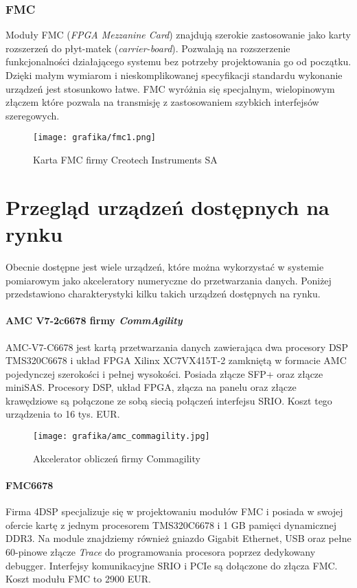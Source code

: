 \subsubsection{FMC}
Moduły FMC (\textit{FPGA Mezzanine Card}) znajdują szerokie zastosowanie jako karty rozszerzeń do płyt-matek (\textit{carrier-board}). Pozwalają na rozszerzenie funkcjonalności działającego systemu bez potrzeby projektowania go od początku. Dzięki małym wymiarom i nieskomplikowanej  specyfikacji standardu wykonanie urządzeń jest stosunkowo łatwe. FMC wyróżnia się specjalnym, wielopinowym złączem które pozwala na transmisję z zastosowaniem szybkich interfejsów szeregowych. 

	\begin{figure}[!ht]
	\begin{center}
	\texttt{[image: grafika/fmc1.png]}
	\end{center}
	\caption{Karta FMC firmy Creotech Instruments SA}
	\end{figure}
	

\section{Przegląd urządzeń dostępnych na rynku}
Obecnie dostępne jest wiele urządzeń, które można wykorzystać w systemie pomiarowym jako akceleratory numeryczne do przetwarzania danych. Poniżej przedstawiono charakterystyki kilku takich urządzeń dostępnych na rynku.

\paragraph {AMC V7-2c6678 firmy \textit{CommAgility}}
AMC-V7-C6678 \cite{COMMAGILITY} jest kartą przetwarzania danych zawierająca dwa procesory DSP TMS320C6678 i układ FPGA Xilinx XC7VX415T-2 zamkniętą w formacie AMC pojedynczej szerokości i pełnej wysokości. Posiada złącze SFP+ oraz złącze miniSAS. Procesory DSP, układ FPGA, złącza na panelu oraz złącze krawędziowe są połączone ze sobą siecią połączeń interfejsu SRIO. Koszt tego urządzenia to 16 tys. EUR. 

	\begin{figure}[!ht]
	\begin{center}
	\texttt{[image: grafika/amc\_commagility.jpg]}
	\end{center}
	\caption{Akcelerator obliczeń firmy Commagility}
	\label{COMMAGILITY}
	\end{figure}

\paragraph{FMC6678}
Firma 4DSP specjalizuje się w projektowaniu modułów FMC i posiada w swojej ofercie kartę z jednym procesorem TMS320C6678 i 1 GB pamięci dynamicznej DDR3. Na module znajdziemy również gniazdo Gigabit Ethernet, USB oraz pełne 60-pinowe złącze \textit{Trace} do programowania procesora poprzez dedykowany debugger. Interfejsy komunikacyjne SRIO i PCIe są dołączone do złącza FMC. Koszt modułu FMC to 2900 EUR.

